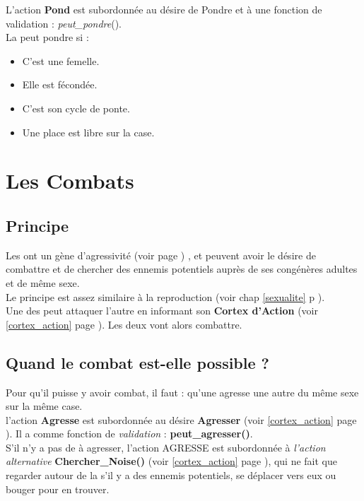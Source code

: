 \documentclass[french]{report}
\begin{document}
L'action \textbf{Pond} est subordonnée au désire de Pondre et à une fonction de validation : \textit{peut\_pondre}().\\

La \CoCiX peut pondre si : 
\begin{itemize}
	\item C'est une femelle.
	\item Elle est fécondée.
	\item C'est son cycle de ponte.
	\item Une place est libre sur la case.\\
\end{itemize}

\newpage
\chapter{Les Combats}\label{combat}
\section{Principe}

Les \CoCiX ont un gène d'agressivité (voir page \pageref{agressivite}) , et peuvent avoir le désire de combattre et de chercher des ennemis potentiels auprès de ses congénères adultes et de même sexe.\\
Le principe est assez similaire à la reproduction (voir chap \ref{sexualite} p \pageref{sexualite}). \\

Une des \CoCiX peut attaquer l'autre en informant son \textbf{Cortex d'Action} (voir \ref{cortex_action} page \pageref{cortex_action}). Les deux \CoCiX vont alors combattre.\\

\section{Quand le combat est-elle possible ?}

Pour qu'il puisse y avoir combat, il faut  : qu'une  \CoCiX agresse une autre \CoCiX du même sexe sur la même case.\\

l'action \textbf{Agresse} est subordonnée au désire \textbf{Agresser} (voir \ref{cortex_action} page \pageref{cortex_action}). Il a comme fonction de \textit{validation} : \textbf{peut\_agresser()}. \\

S'il n'y a pas de \CoCiX à agresser, l'action AGRESSE est subordonnée à \textit{l'action alternative} \textbf{Chercher\_Noise()} (voir \ref{cortex_action} page \pageref{cortex_action}), qui ne fait que regarder autour de la \CoCiX s'il y a des ennemis potentiels, se déplacer vers eux ou bouger pour en trouver.\\
\end{document}
